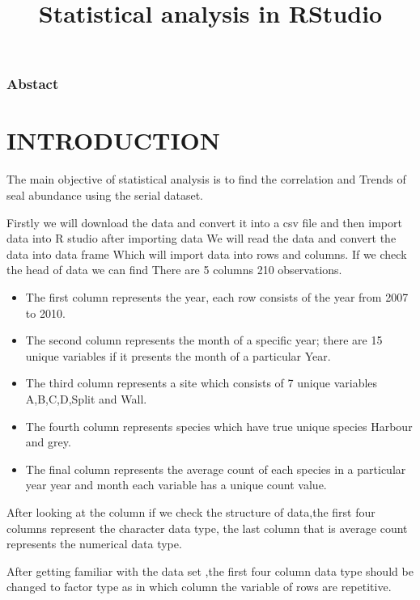 \documentclass[
]{article}
\title{Statistical analysis in RStudio}
\author{}
\date{\vspace{-2.5em}}
\providecommand{\tightlist}{%
  \setlength{\itemsep}{0pt}\setlength{\parskip}{0pt}}
\begin{document}
\maketitle

{
\setcounter{tocdepth}{2}
\tableofcontents
}
\hypertarget{abstact}{%
\subsubsection{Abstact}\label{abstact}}

\hypertarget{introduction}{%
\section{INTRODUCTION}\label{introduction}}

The main objective of statistical analysis is to find the correlation
and Trends of seal abundance using the serial dataset.

Firstly we will download the data and convert it into a csv file and
then import data into R studio after importing data We will read the
data and convert the data into data frame Which will import data into
rows and columns. If we check the head of data we can find There are 5
columns 210 observations.

\begin{itemize}
\tightlist
\item
  The first column represents the year, each row consists of the year
  from 2007 to 2010.
\item
  The second column represents the month of a specific year; there are
  15 unique variables if it presents the month of a particular Year.
\item
  The third column represents a site which consists of 7 unique
  variables A,B,C,D,Split and Wall.
\item
  The fourth column represents species which have true unique species
  Harbour and grey.
\item
  The final column represents the average count of each species in a
  particular year year and month each variable has a unique count value.
\end{itemize}

After looking at the column if we check the structure of data,the first
four columns represent the character data type, the last column that is
average count represents the numerical data type.

After getting familiar with the data set ,the first four column data
type should be changed to factor type as in which column the variable of
rows are repetitive.
\end{document}
